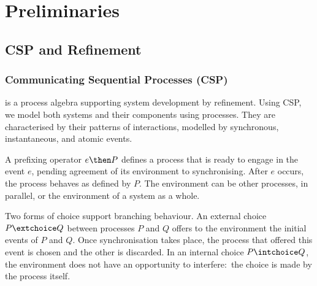 \section{Preliminaries}
\label{section:preliminaries}

\subsection{CSP and Refinement}



\subsubsection*{Communicating Sequential Processes (CSP)} is a process algebra 
supporting system development by refinement. Using CSP, we model both systems and
their components using processes. They are characterised by their patterns
of interactions, modelled by synchronous, instantaneous, and atomic events.

A prefixing operator $e \then P$ defines a process that is ready to engage in
the event $e$, pending agreement of its environment to synchronising. After
$e$ occurs, the process behaves as defined by $P$. The environment can be
other processes, in parallel, or the environment of a system as a whole.

Two forms of choice support branching behaviour. An external choice $P
\extchoice Q$ between processes $P$ and $Q$ offers to the environment the
initial events of $P$ and $Q$. Once synchronisation takes place, the process
that offered this event is chosen and the other is discarded. In an internal
choice $P \intchoice Q$, the environment does not have an opportunity to
interfere:~the choice is made by the process itself.

